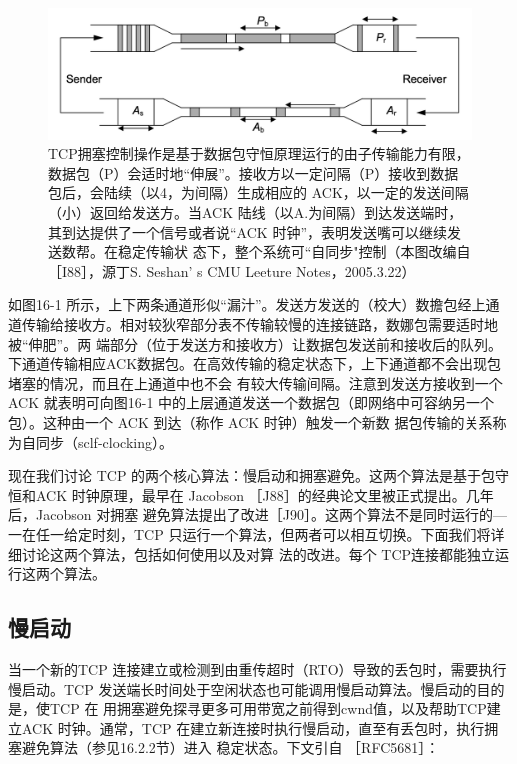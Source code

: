 \begin{figure}[!htb]
    \centering
	\includegraphics[width=1\textwidth]{imgs/16/16-1.png}
	\caption{TCP拥塞控制操作是基于数据包守恒原理运行的由子传输能力有限，数据包（P）会适时地“伸展”。接收方以一定问隔（P）接收到数据包后，会陆续（以4，为间隔）生成相应的
    ACK，以一定的发送间隔（小）返回给发送方。当ACK 陆线（以A.为间隔）到达发送端时，其到达提供了一个信号或者说“ACK 时钟”，表明发送嘴可以继续发送数帮。在稳定传输状
    态下，整个系统可“自同步"控制（本图改编自 ［I88］，源丁S. Seshan' s CMU Leeture Notes，2005.3.22）}
\end{figure}

如图16-1 所示，上下两条通道形似“漏汁”。发送方发送的（校大）数擔包经上通道传输给接收方。相对较狄窄部分表不传输较慢的连接链路，数娜包需要适时地被“伸肥”。两
端部分（位于发送方和接收方）让数据包发送前和接收后的队列。下通道传输相应ACK数据包。在高效传输的稳定状态下，上下通道都不会出现包堵塞的情况，而且在上通道中也不会
有较大传输间隔。注意到发送方接收到一个 ACK 就表明可向图16-1 中的上层通道发送一个数据包（即网络中可容纳另一个包）。这种由一个 ACK 到达（称作 ACK 时钟）触发一个新数
据包传输的关系称为自同步（sclf-clocking）。

现在我们讨论 TCP 的两个核心算法：慢启动和拥塞避免。这两个算法是基于包守恒和ACK 时钟原理，最早在 Jacobson ［J88］的经典论文里被正式提出。几年后，Jacobson 对拥塞
避免算法提出了改进［J90］。这两个算法不是同时运行的—一在任一给定时刻，TCP 只运行一个算法，但两者可以相互切换。下面我们将详细讨论这两个算法，包括如何使用以及对算
法的改进。每个 TCP连接都能独立运行这两个算法。

\subsection{慢启动}
当一个新的TCP 连接建立或检测到由重传超时（RTO）导致的丢包时，需要执行慢启动。TCP 发送端长时间处于空闲状态也可能调用慢启动算法。慢启动的目的是，使TCP 在
用拥塞避免探寻更多可用带宽之前得到cwnd值，以及帮助TCP建立ACK 时钟。通常，TCP 在建立新连接时执行慢启动，直至有丢包时，执行拥塞避免算法（参见16.2.2节）进入
稳定状态。下文引自 ［RFC5681］：

